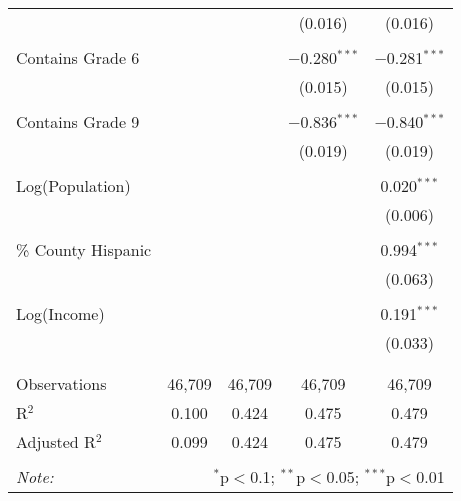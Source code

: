 \begin{table}[!htbp]
\begin{tabular}{@{\extracolsep{-2pt}}lcccc}
  &  &  & (0.016) & (0.016) \\ 
  & & & & \\ 
 Contains Grade 6 &  &  & $-$0.280$^{***}$ & $-$0.281$^{***}$ \\ 
  &  &  & (0.015) & (0.015) \\ 
  & & & & \\ 
 Contains Grade 9 &  &  & $-$0.836$^{***}$ & $-$0.840$^{***}$ \\ 
  &  &  & (0.019) & (0.019) \\ 
  & & & & \\ 
 Log(Population) &  &  &  & 0.020$^{***}$ \\ 
  &  &  &  & (0.006) \\ 
  & & & & \\ 
 \% County Hispanic &  &  &  & 0.994$^{***}$ \\ 
  &  &  &  & (0.063) \\ 
  & & & & \\ 
 Log(Income) &  &  &  & 0.191$^{***}$ \\ 
  &  &  &  & (0.033) \\ 
  & & & & \\ 
\hline \\[-1.8ex] 
Observations & 46,709 & 46,709 & 46,709 & 46,709 \\ 
R$^{2}$ & 0.100 & 0.424 & 0.475 & 0.479 \\ 
Adjusted R$^{2}$ & 0.099 & 0.424 & 0.475 & 0.479 \\ 
\hline 
\hline \\[-1.8ex] 
\textit{Note:}  & \multicolumn{4}{r}{$^{*}$p$<$0.1; $^{**}$p$<$0.05; $^{***}$p$<$0.01} \\ 
\end{tabular} 
\end{table} 
